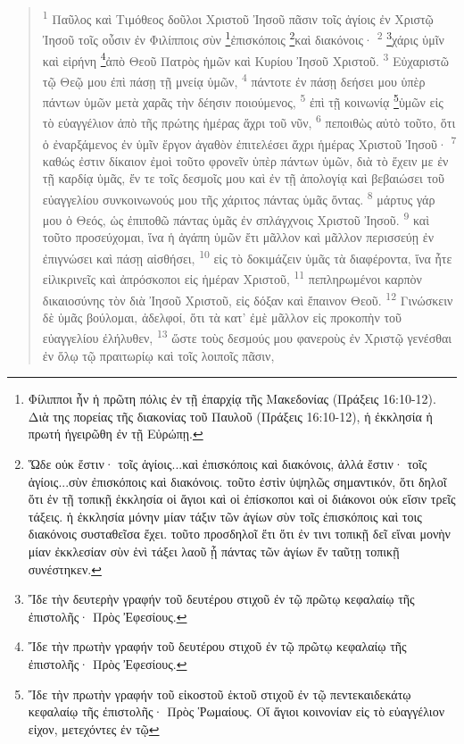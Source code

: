\documentclass{article}
\begin{document}
\begin{verse}
\textsuperscript{1} Παῦλος καὶ Τιμόθεος δοῦλοι Χριστοῦ Ἰησοῦ πᾶσιν τοῖς ἁγίοις ἐν Χριστῷ Ἰησοῦ τοῖς οὖσιν ἐν Φιλίπποις σὺν \footnote{Φίλιπποι ἦν ἡ πρῶτη πόλις ἐν τῇ ἐπαρχίᾳ τῆς Μακεδονίας (Πράξεις 16:10-12). Διὰ της πορείας τῆς διακονίας τοῦ Παυλοῦ (Πράξεις 16:10-12), ἡ ἐκκλησία ἡ πρωτή ἠγειρῶθη ἐν τῇ Εὐρώπῃ.}ἐπισκόποις \footnote{Ὥδε οὐκ ἔστιν· τοῖς ἁγίοις...καὶ ἐπισκόποις καὶ διακόνοις, ἀλλά ἔστιν· τοῖς ἁγίοις...σὺν ἐπισκόποις καὶ διακόνοις. τοῦτο ἐστὶν ὑψηλῶς σημαντικόν, ὅτι δηλοῖ ὅτι ἐν τῇ τοπικῇ ἐκκλησία οἱ ἅγιοι καὶ οἱ ἐπίσκοποι καὶ οἱ διάκονοι οὐκ εἴσιν τρεῖς τάξεις. ἡ ἐκκλησία μόνην μίαν τάξιν τῶν ἁγίων σὺν τοῖς ἐπισκόποις καὶ τοις διακόνοις συσταθεῖσα ἔχει. τοῦτο προσδηλοῖ ἔτι ὅτι ἐν τινι τοπικῇ δεῖ εἴναι μονὴν μίαν ἐκκλεσίαν σὺν ἑνὶ τάξει λαοῦ ᾗ πάντας τῶν ἁγίων ἔν ταῦτῃ τοπικῇ συνέστηκεν.}καὶ διακόνοις·
\textsuperscript{2} \footnote{Ἴδε τὴν δευτερὴν γραφήν τοῦ δευτέρου στιχοῦ ἐν τῷ πρῶτῳ κεφαλαίῳ τῆς ἐπιστολῆς· Πρὸς Ἐφεσίους.}χάρις ὑμῖν καὶ εἰρήνη \footnote{Ἴδε τὴν πρωτὴν γραφήν τοῦ δευτέρου στιχοῦ ἐν τῷ πρῶτῳ κεφαλαίῳ τῆς ἐπιστολῆς· Πρὸς Ἐφεσίους.}ἀπὸ Θεοῦ Πατρὸς ἡμῶν καὶ Κυρίου Ἰησοῦ Χριστοῦ.
\textsuperscript{3} Εὐχαριστῶ τῷ Θεῷ μου ἐπὶ πάσῃ τῇ μνείᾳ ὑμῶν,
\textsuperscript{4} πάντοτε ἐν πάσῃ δεήσει μου ὑπὲρ πάντων ὑμῶν μετὰ χαρᾶς τὴν δέησιν ποιούμενος,
\textsuperscript{5} ἐπὶ τῇ κοινωνίᾳ \footnote{Ἴδε τὴν πρωτὴν γραφήν τοῦ εἰκοστοῦ ἑκτοῦ στιχοῦ ἐν τῷ πεντεκαιδεκάτῳ κεφαλαίῳ τῆς ἐπιστολῆς· Πρὸς Ῥωμαίους. Οἵ ἅγιοι κοινονίαν εἰς τὸ εὐαγγέλιον εἰχον, μετεχόντες ἐν τῷ}ὑμῶν εἰς τὸ εὐαγγέλιον ἀπὸ τῆς πρώτης ἡμέρας ἄχρι τοῦ νῦν,
\textsuperscript{6} πεποιθὼς αὐτὸ τοῦτο, ὅτι ὁ ἐναρξάμενος ἐν ὑμῖν ἔργον ἀγαθὸν ἐπιτελέσει ἄχρι ἡμέρας Χριστοῦ Ἰησοῦ·
\textsuperscript{7} καθώς ἐστιν δίκαιον ἐμοὶ τοῦτο φρονεῖν ὑπὲρ πάντων ὑμῶν, διὰ τὸ ἔχειν με ἐν τῇ καρδίᾳ ὑμᾶς, ἔν τε τοῖς δεσμοῖς μου καὶ ἐν τῇ ἀπολογίᾳ καὶ βεβαιώσει τοῦ εὐαγγελίου συνκοινωνούς μου τῆς χάριτος πάντας ὑμᾶς ὄντας.
\textsuperscript{8} μάρτυς γάρ μου ὁ Θεός, ὡς ἐπιποθῶ πάντας ὑμᾶς ἐν σπλάγχνοις Χριστοῦ Ἰησοῦ.
\textsuperscript{9} καὶ τοῦτο προσεύχομαι, ἵνα ἡ ἀγάπη ὑμῶν ἔτι μᾶλλον καὶ μᾶλλον περισσεύῃ ἐν ἐπιγνώσει καὶ πάσῃ αἰσθήσει,
\textsuperscript{10} εἰς τὸ δοκιμάζειν ὑμᾶς τὰ διαφέροντα, ἵνα ἦτε εἰλικρινεῖς καὶ ἀπρόσκοποι εἰς ἡμέραν Χριστοῦ,
\textsuperscript{11} πεπληρωμένοι καρπὸν δικαιοσύνης τὸν διὰ Ἰησοῦ Χριστοῦ, εἰς δόξαν καὶ ἔπαινον Θεοῦ.
\textsuperscript{12} Γινώσκειν δὲ ὑμᾶς βούλομαι, ἀδελφοί, ὅτι τὰ κατ’ ἐμὲ μᾶλλον εἰς προκοπὴν τοῦ εὐαγγελίου ἐλήλυθεν,
\textsuperscript{13} ὥστε τοὺς δεσμούς μου φανεροὺς ἐν Χριστῷ γενέσθαι ἐν ὅλῳ τῷ πραιτωρίῳ καὶ τοῖς λοιποῖς πᾶσιν,

\end{verse}
\end{document}
